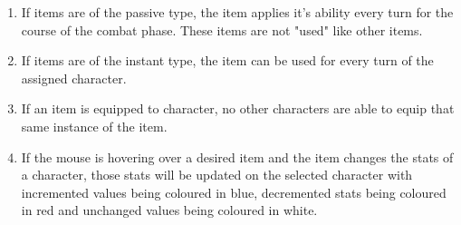\documentclass{article}
\begin{document}
\begin{enumerate}[{AGR}1. ]
	\item If items are of the passive type, the item applies it's ability every turn for the course of the combat phase. These items are not "used" like other items.
	\item If items are of the instant type, the item can be used for every turn of the assigned character.
	\item If an item is equipped to character, no other characters are able to equip that same instance of the item.
	\item If the mouse is hovering over a desired item and the item changes the stats of a character, those stats will be updated on the selected character with incremented values being coloured in blue, decremented stats being coloured in red and unchanged values being coloured in white.
\end{enumerate}
\end{document}
